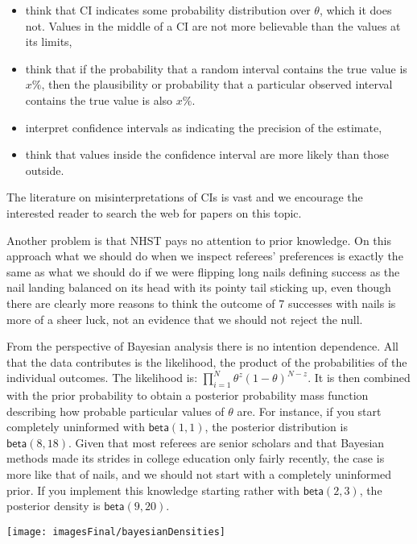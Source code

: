  \begin{itemize}
\item   think that CI indicates some probability distribution over $\theta$, which it does not. Values in the middle of a CI are not more believable than the values at its limits,

\item   think that  if the probability that a random interval contains the true value is $x\%$, then the plausibility or probability that a particular observed interval contains the true value is also $x\%$. 

\item    interpret confidence intervals as indicating the precision of the estimate,

\item  think that values inside the confidence interval are more likely than those outside.

\end{itemize}

\noindent The literature on misinterpretations of CIs is vast and we encourage the interested reader to search the web for papers on this topic.





Another problem is that NHST pays no attention to prior knowledge. On this approach what we should do when we inspect referees' preferences is exactly the same as what we should do if we were flipping long nails defining success as the nail landing balanced on its head with its pointy tail sticking up, even though there are clearly more reasons to think the outcome of 7 successes with nails is more of a sheer luck, not an evidence that we should not reject the null. 


From the perspective of Bayesian analysis there is no intention dependence. All that the data contributes is the likelihood, the product of the probabilities of the individual outcomes. The likelihood is:
    $\prod_{i = 1}^{N} \theta^z(1- \theta)^{N-z}$. It is then combined with the prior probability to obtain a posterior probability mass function describing how probable particular values of $\theta$ are. For instance, if you start completely uninformed with $\mathsf{beta}(1,1)$, the posterior distribution is $\mathsf{beta}(8,18)$. Given that most referees are senior scholars and that Bayesian methods made its strides in college education only fairly recently, the case is more like that of nails, and we should not start with a completely uninformed prior. If you implement this knowledge starting rather with $\mathsf{beta}(2, 3)$, the posterior density is $\mathsf{beta}(9,20)$.
\begin{center}
\texttt{[image: imagesFinal/bayesianDensities]} 
\end{center}

